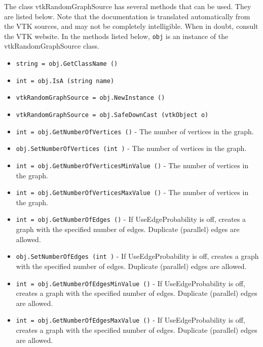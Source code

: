 The class vtkRandomGraphSource has several methods that can be used.
  They are listed below.
Note that the documentation is translated automatically from the VTK sources,
and may not be completely intelligible.  When in doubt, consult the VTK website.
In the methods listed below, \verb|obj| is an instance of the vtkRandomGraphSource class.
\begin{itemize}
\item  \verb|string = obj.GetClassName ()|

\item  \verb|int = obj.IsA (string name)|

\item  \verb|vtkRandomGraphSource = obj.NewInstance ()|

\item  \verb|vtkRandomGraphSource = obj.SafeDownCast (vtkObject o)|

\item  \verb|int = obj.GetNumberOfVertices ()| -  The number of vertices in the graph.

\item  \verb|obj.SetNumberOfVertices (int )| -  The number of vertices in the graph.

\item  \verb|int = obj.GetNumberOfVerticesMinValue ()| -  The number of vertices in the graph.

\item  \verb|int = obj.GetNumberOfVerticesMaxValue ()| -  The number of vertices in the graph.

\item  \verb|int = obj.GetNumberOfEdges ()| -  If UseEdgeProbability is off, creates a graph with the specified number
 of edges.  Duplicate (parallel) edges are allowed.

\item  \verb|obj.SetNumberOfEdges (int )| -  If UseEdgeProbability is off, creates a graph with the specified number
 of edges.  Duplicate (parallel) edges are allowed.

\item  \verb|int = obj.GetNumberOfEdgesMinValue ()| -  If UseEdgeProbability is off, creates a graph with the specified number
 of edges.  Duplicate (parallel) edges are allowed.

\item  \verb|int = obj.GetNumberOfEdgesMaxValue ()| -  If UseEdgeProbability is off, creates a graph with the specified number
 of edges.  Duplicate (parallel) edges are allowed.


\end{itemize}
